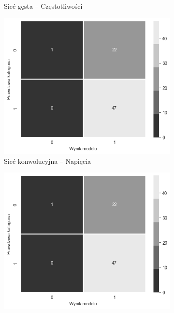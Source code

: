 \documentclass{./assets/wfis}
\begin{document}
\begin{figure}[h!]
\begin{subfigure}[b]{0.45\textwidth}
        \caption{Sieć gęsta – Częstotliwości}
        \label{fig:psychoactive-substances}
    \end{subfigure}
    \begin{subfigure}[b]{0.45\textwidth}
        \centering
        \includegraphics[width=\columnwidth]{thesis/assets/confusion_matrix_placeholder.png}
        \caption{Sieć konwolucyjna – Napięcia}
        \label{fig:computer-time}
    \end{subfigure}   
    \hfill
    \begin{subfigure}[b]{0.45\textwidth}
        \centering
        \includegraphics[width=\columnwidth]{thesis/assets/confusion_matrix_placeholder.png}

\end{subfigure}
\end{figure}
\end{document}
